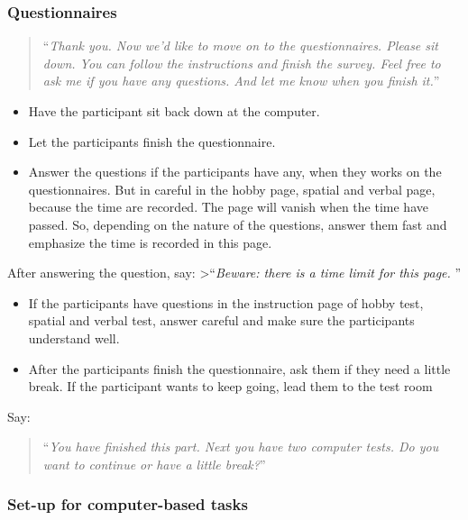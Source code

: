 \documentclass[]{article}
\providecommand{\tightlist}{%
  \setlength{\itemsep}{0pt}\setlength{\parskip}{0pt}}
\begin{document}
\subsubsection{Questionnaires}\label{questionnaires}

\begin{quote}
``\emph{Thank you. Now we'd like to move on to the questionnaires.
Please sit down. You can follow the instructions and finish the survey.
Feel free to ask me if you have any questions. And let me know when you
finish it.}''
\end{quote}

\begin{itemize}
\tightlist
\item
  Have the participant sit back down at the computer.
\item
  Let the participants finish the questionnaire.
\item
  Answer the questions if the participants have any, when they works on
  the questionnaires. But in careful in the hobby page, spatial and
  verbal page, because the time are recorded. The page will vanish when
  the time have passed. So, depending on the nature of the questions,
  answer them fast and emphasize the time is recorded in this page.
\end{itemize}

After answering the question, say: \textgreater{}``\emph{Beware: there
is a time limit for this page. }''

\begin{itemize}
\tightlist
\item
  If the participants have questions in the instruction page of hobby
  test, spatial and verbal test, answer careful and make sure the
  participants understand well.
\item
  After the participants finish the questionnaire, ask them if they need
  a little break. If the participant wants to keep going, lead them to
  the test room
\end{itemize}

Say:

\begin{quote}
``\emph{You have finished this part. Next you have two computer tests.
Do you want to continue or have a little break?}''
\end{quote}

\subsubsection{Set-up for computer-based
tasks}\label{set-up-for-computer-based-tasks-1}
\end{document}
